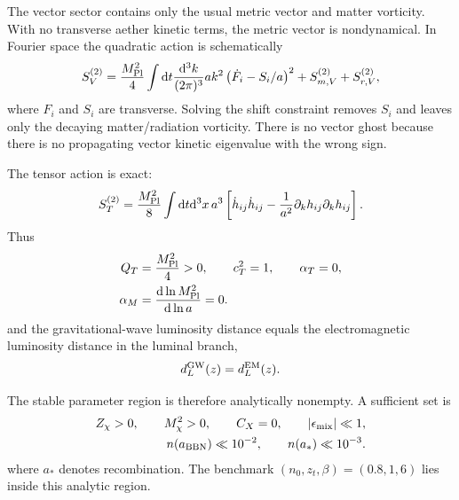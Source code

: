 \documentclass[aps,prd,reprint,nofootinbib,superscriptaddress,longbibliography]{revtex4-2}
\newcommand{\dd}{\mathrm{d}}
\newcommand{\mpl}{M_{\rm Pl}}
\begin{document}
The vector sector contains only the usual metric vector and matter vorticity.  With no transverse aether kinetic terms, the metric vector is nondynamical.  In Fourier space the quadratic action is schematically
\begin{equation}
  S_V^{(2)}=\frac{\mpl^2}{4}\int\dd t\frac{\dd^3k}{(2\pi)^3}a k^2
  \left(\dot F_i-S_i/a\right)^2+S_{m,V}^{(2)}+S_{r,V}^{(2)},
  \label{eq:vector_action}
\end{equation}
where $F_i$ and $S_i$ are transverse.  Solving the shift constraint removes $S_i$ and leaves only the decaying matter/radiation vorticity.  There is no vector ghost because there is no propagating vector kinetic eigenvalue with the wrong sign.

The tensor action is exact:
\begin{equation}
  S_T^{(2)}=\frac{\mpl^2}{8}\int\dd t\dd^3x\,a^3
  \left[\dot h_{ij}\dot h_{ij}-\frac{1}{a^2}\partial_kh_{ij}\partial_kh_{ij}\right].
  \label{eq:tensor_action_complete}
\end{equation}
Thus
\begin{align}
  Q_T&=\frac{\mpl^2}{4}>0,
  \qquad c_T^2=1,
  \qquad \alpha_T=0,\label{eq:tensor_conditions_complete}\\
  \alpha_M&=\frac{\dd\ln \mpl^2}{\dd\ln a}=0 .\nonumber
\end{align}
and the gravitational-wave luminosity distance equals the electromagnetic luminosity distance in the luminal branch,
\begin{equation}
  d_L^{\rm GW}(z)=d_L^{\rm EM}(z).
  \label{eq:gw_lum_distance}
\end{equation}

The stable parameter region is therefore analytically nonempty.  A sufficient set is
\begin{align}
  Z_\chi>0,
  \qquad M_\chi^2>0,
  \qquad C_X=0,
  \qquad |\epsilon_{\rm mix}|\ll1,\label{eq:stable_region_sufficient}\\
  n(a_{\rm BBN})\ll10^{-2},
  \qquad n(a_*)\ll10^{-3}.\nonumber
\end{align}
where $a_*$ denotes recombination.  The benchmark $(n_0,z_t,\beta)=(0.8,1,6)$ lies inside this analytic region.
\end{document}
